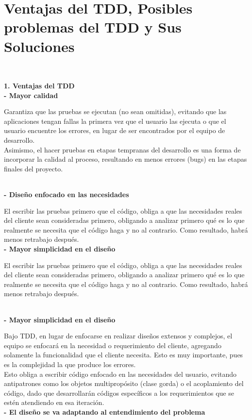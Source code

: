 \section{Ventajas del TDD, Posibles problemas del TDD y Sus Soluciones} 
\textbf{}\\

\begin{flushleft}
\begin{itemize}
\textbf{1.   Ventajas del TDD}
\textbf{}\\
\textbf{- Mayor calidad }

Garantiza que las pruebas se ejecutan (no sean omitidas), evitando que las aplicaciones tengan fallas la primera vez que el usuario las ejecuta o que el usuario encuentre los errores, en lugar de ser encontrados por el equipo de desarrollo. \textbf{}\\
Asimismo, el hacer pruebas en etapas tempranas del desarrollo es una forma de incorporar la calidad al proceso, resultando en menos errores (bugs) en las etapas finales del proyecto. 

\textbf{}\\
\textbf{- Diseño enfocado en las necesidades }

El escribir las pruebas primero que el código, obliga a que las necesidades reales del cliente sean consideradas primero, obligando a analizar primero qué es lo que realmente se necesita que el código haga y no al contrario. Como resultado, habrá menos retrabajo después. 
\textbf{}\\
\textbf{- Mayor simplicidad en el diseño  }

El escribir las pruebas primero que el código, obliga a que las necesidades reales del cliente sean consideradas primero, obligando a analizar primero qué es lo que realmente se necesita que el código haga y no al contrario. Como resultado, habrá menos retrabajo después. 

\textbf{}\\
\textbf{- Mayor simplicidad en el diseño  }

Bajo TDD, en lugar de enfocarse en realizar diseños extensos y complejos, el equipo se enfocará en la necesidad o requerimiento del cliente, agregando solamente la funcionalidad que el cliente necesita. Esto es muy importante, pues es la complejidad la que produce los errores. \textbf{}\\

Esto obliga a escribir código enfocado en las necesidades del usuario, evitando antipatrones como los objetos multipropósito (clase gorda) o el acoplamiento del código, dado que desarrollarán códigos específicos a los requerimientos que se estén atendiendo en esa iteración. 
\textbf{}\\
\textbf{- El diseño se va adaptando al entendimiento del problema }


\end{itemize}
\end{flushleft}
